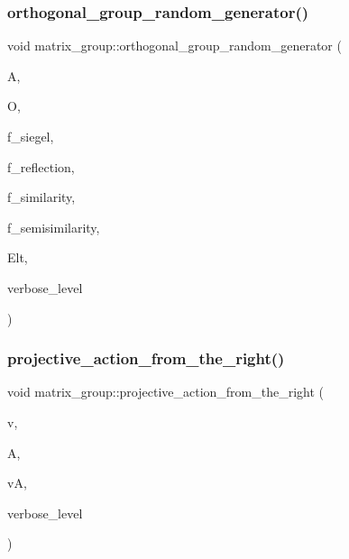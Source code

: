 \subsubsection{\texorpdfstring{orthogonal\+\_\+group\+\_\+random\+\_\+generator()}{orthogonal\_group\_random\_generator()}}
{\footnotesize\ttfamily void matrix\+\_\+group\+::orthogonal\+\_\+group\+\_\+random\+\_\+generator (\begin{DoxyParamCaption}\item[{\mbox{\hyperlink{classaction}{action}} $\ast$}]{A,  }\item[{\mbox{\hyperlink{classorthogonal}{orthogonal}} $\ast$}]{O,  }\item[{\mbox{\hyperlink{galois_8h_a09fddde158a3a20bd2dcadb609de11dc}{I\+NT}}}]{f\+\_\+siegel,  }\item[{\mbox{\hyperlink{galois_8h_a09fddde158a3a20bd2dcadb609de11dc}{I\+NT}}}]{f\+\_\+reflection,  }\item[{\mbox{\hyperlink{galois_8h_a09fddde158a3a20bd2dcadb609de11dc}{I\+NT}}}]{f\+\_\+similarity,  }\item[{\mbox{\hyperlink{galois_8h_a09fddde158a3a20bd2dcadb609de11dc}{I\+NT}}}]{f\+\_\+semisimilarity,  }\item[{\mbox{\hyperlink{galois_8h_a09fddde158a3a20bd2dcadb609de11dc}{I\+NT}} $\ast$}]{Elt,  }\item[{\mbox{\hyperlink{galois_8h_a09fddde158a3a20bd2dcadb609de11dc}{I\+NT}}}]{verbose\+\_\+level }\end{DoxyParamCaption})}

\mbox{\label{classmatrix__group_a9cd8bfb088a31889bb49f8ec8327db15}} 
\subsubsection{\texorpdfstring{projective\+\_\+action\+\_\+from\+\_\+the\+\_\+right()}{projective\_action\_from\_the\_right()}}
{\footnotesize\ttfamily void matrix\+\_\+group\+::projective\+\_\+action\+\_\+from\+\_\+the\+\_\+right (\begin{DoxyParamCaption}\item[{\mbox{\hyperlink{galois_8h_a09fddde158a3a20bd2dcadb609de11dc}{I\+NT}} $\ast$}]{v,  }\item[{\mbox{\hyperlink{galois_8h_a09fddde158a3a20bd2dcadb609de11dc}{I\+NT}} $\ast$}]{A,  }\item[{\mbox{\hyperlink{galois_8h_a09fddde158a3a20bd2dcadb609de11dc}{I\+NT}} $\ast$}]{vA,  }\item[{\mbox{\hyperlink{galois_8h_a09fddde158a3a20bd2dcadb609de11dc}{I\+NT}}}]{verbose\+\_\+level }\end{DoxyParamCaption})}

